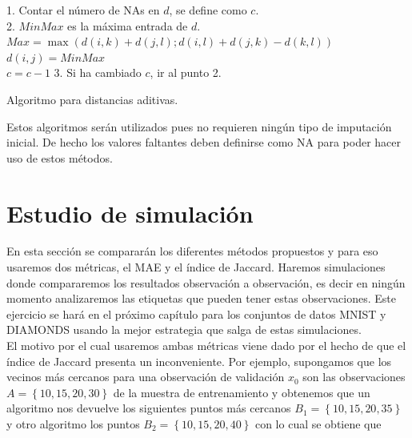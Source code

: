\documentclass[12pt]{report} %
\theoremstyle{definition}
\begin{document}
{\begin{algorithm}[H] 
	\SetAlgoLined
	1. Contar el número de NAs en $d$, se define como $c$.\\
	2. 
	{
		$MinMax$ es la máxima entrada de $d$.\\
		{
			$Max = \max(d(i,k)+d(j,l);d(i,l) + d(j,k) - d(k,l))$\\
		}
		{$d(i,j) = MinMax$\\
			$c = c-1$}
	}
	3. Si ha cambiado $c$, ir al punto 2.
	\caption{Algoritmo para distancias aditivas.}
\end{algorithm}
\vspace{0.5cm}

Estos algoritmos serán utilizados pues no requieren ningún tipo de imputación inicial. De hecho los valores faltantes deben definirse como NA para poder hacer uso de estos métodos. 

\section{Estudio de simulación}

En esta sección se compararán los diferentes métodos propuestos y para eso usaremos dos métricas, el MAE y el índice de Jaccard. Haremos simulaciones donde compararemos los resultados observación a observación, es decir en ningún momento analizaremos las etiquetas que pueden tener estas observaciones. Este ejercicio se hará en el próximo capítulo para los conjuntos de datos MNIST y DIAMONDS usando la mejor estrategia que salga de estas simulaciones.\\

El motivo por el cual usaremos ambas métricas viene dado por el hecho de que el índice de Jaccard presenta un inconveniente. Por ejemplo, supongamos que los vecinos más cercanos para una observación de validación $x_0$ son las observaciones $A=\left\lbrace 10,15,20,30\right\rbrace $ de la muestra de entrenamiento y obtenemos que un algoritmo nos devuelve los siguientes puntos más cercanos $B_1= \left\lbrace 10,15,20,35\right\rbrace $ y otro algoritmo los puntos $B_2= \left\lbrace 10,15,20,40\right\rbrace $ con lo cual se obtiene que 

}
\end{document}
